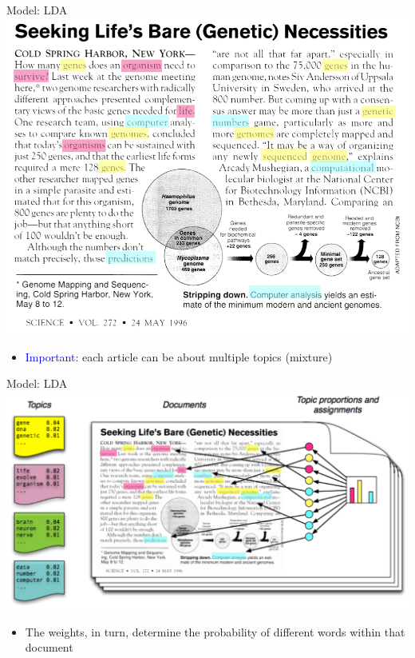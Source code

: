 \documentclass[english]{beamer}
\begin{document}
\begin{frame}{Model: LDA}
\centering
\includegraphics[width=0.85 \textwidth]{Images/page.png}
\begin{itemize}
\item \textcolor{blue}{Important}: each article can be about multiple topics (mixture)
\end{itemize}
\end{frame}
\begin{frame}{Model: LDA}
\centering
\includegraphics[width=1 \textwidth]{Images/page2.png}
\begin{itemize}
\item The weights, in turn, determine the probability of different words within that document 
\end{itemize}
\end{frame}
\end{document}
